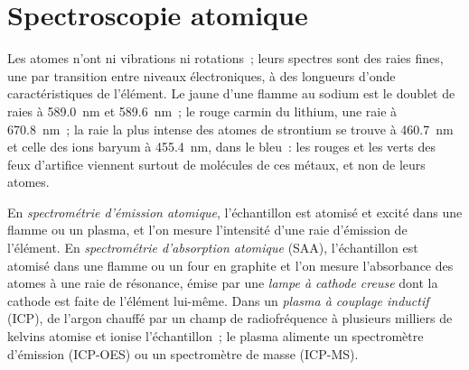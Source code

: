 \section{Spectroscopie atomique}

Les atomes n'ont ni vibrations ni rotations~; leurs spectres sont des raies fines, une par transition entre
niveaux électroniques, à des longueurs d'onde caractéristiques de l'élément. Le jaune d'une flamme au
sodium est le doublet de raies à \qty{589.0}{nm} et \qty{589.6}{nm}~; le rouge carmin du lithium, une raie
à \qty{670.8}{nm}~;
la raie la plus intense des atomes de strontium se trouve à \qty{460.7}{nm} et celle des ions baryum à
\qty{455.4}{nm}, dans le bleu~: les rouges et les verts des feux d'artifice viennent surtout de molécules
de ces métaux, et non de leurs atomes.

\begin{definition}\label{def:b2:mass-spec-atomic:atomic}
En \emph{spectrométrie d'émission atomique},
l'échantillon est atomisé et excité dans une flamme ou un plasma, et l'on mesure l'intensité d'une raie
d'émission de l'élément. En \emph{spectrométrie d'absorption atomique}
(SAA), l'échantillon est atomisé dans une flamme ou un four en graphite et l'on mesure l'absorbance des
atomes à une raie de résonance, émise par une \emph{lampe à cathode creuse}
dont la cathode est faite de l'élément lui-même. Dans un \emph{plasma à couplage inductif}
(ICP), de l'argon chauffé par un champ de radiofréquence à plusieurs milliers de kelvins atomise et
ionise l'échantillon~; le plasma alimente un spectromètre d'émission (ICP-OES) ou un spectromètre de
masse (ICP-MS).
\end{definition}

